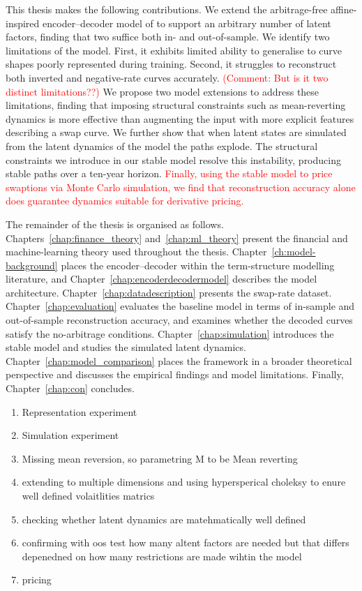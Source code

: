 This thesis makes the following contributions. We extend the arbitrage-free affine-inspired encoder--decoder model of \citet{MatinWanPoulsen2025} to support an arbitrary number of latent factors, finding that two suffice both in- and out-of-sample. We identify two limitations of the model. First, it exhibits limited ability to generalise to curve shapes poorly represented during training. Second, it struggles to reconstruct both inverted and negative-rate curves accurately. \textcolor{red}{(Comment: But is it two distinct limitations??)} We propose two model extensions to address these limitations, finding that imposing structural constraints such as mean-reverting dynamics is more effective than augmenting the input with more explicit features describing a swap curve. We further show that when latent states are simulated from the latent dynamics of the model the paths explode. The structural constraints we introduce in our stable model resolve this instability, producing stable paths over a ten-year horizon. \textcolor{red}{Finally, using the stable model to price swaptions via Monte Carlo simulation, we find that reconstruction accuracy alone does guarantee dynamics suitable for derivative pricing.}

The remainder of the thesis is organised as follows. Chapters~\ref{chap:finance_theory} and~\ref{chap:ml_theory} present the financial and machine-learning theory used throughout the thesis. Chapter~\ref{ch:model-background} places the encoder--decoder within the term-structure modelling literature, and Chapter~\ref{chap:encoderdecodermodel} describes the model architecture. Chapter~\ref{chap:datadescription} presents the swap-rate dataset. Chapter~\ref{chap:evaluation} evaluates the baseline model in terms of in-sample and out-of-sample reconstruction accuracy, and examines whether the decoded curves satisfy the no-arbitrage conditions. Chapter~\ref{chap:simulation} introduces the stable model and studies the simulated latent dynamics. Chapter~\ref{chap:model_comparison} places the framework in a broader theoretical perspective and discusses the empirical findings and model limitations. Finally, Chapter~\ref{chap:con} concludes.


\begin{enumerate}
    \item Representation experiment
    \item Simulation experiment
    \item Missing mean reversion, so parametring M to be Mean reverting
    \item extending to multiple dimensions and using hypersperical choleksy to enure well defined volaitlities matrics 
    \item checking whether latent dynamics are matehmatically well defined
    \item confirming with oos test how many altent factors are needed but that differs depenedned on how many restrictions are made wihtin the model
    \item pricing
\end{enumerate}











